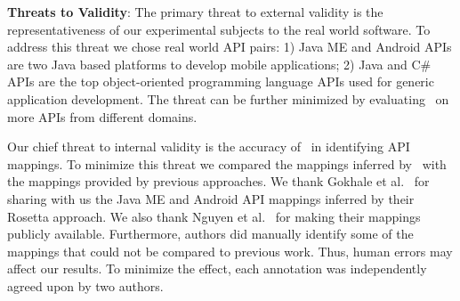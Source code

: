 

 

\textbf{Threats to Validity}: The primary threat to external validity is the representativeness of our experimental subjects to the real world software.
To address this threat we chose real world API pairs:
1) Java ME and Android APIs are two Java based platforms to develop mobile applications; 
2) Java and C\# APIs are the top object-oriented programming language APIs used for generic application development. 
The threat can be further minimized by evaluating \tool\ on more APIs from different domains. 

Our chief threat to internal validity is the accuracy of \tool\ in identifying API mappings. 
To minimize this threat we compared the mappings inferred by \tool\ with
the mappings provided by previous approaches. We thank Gokhale et al.~\cite{Gokhale2013ICSE} for sharing with us the Java ME and Android API mappings inferred by their Rosetta approach. We also thank Nguyen et al.~\cite{nguyen2014statistical} for making their mappings publicly available. Furthermore, authors did manually identify some of the mappings that could not be compared to previous work.
Thus, human errors may affect our results. 
To minimize the effect, each annotation was independently agreed upon by two authors.